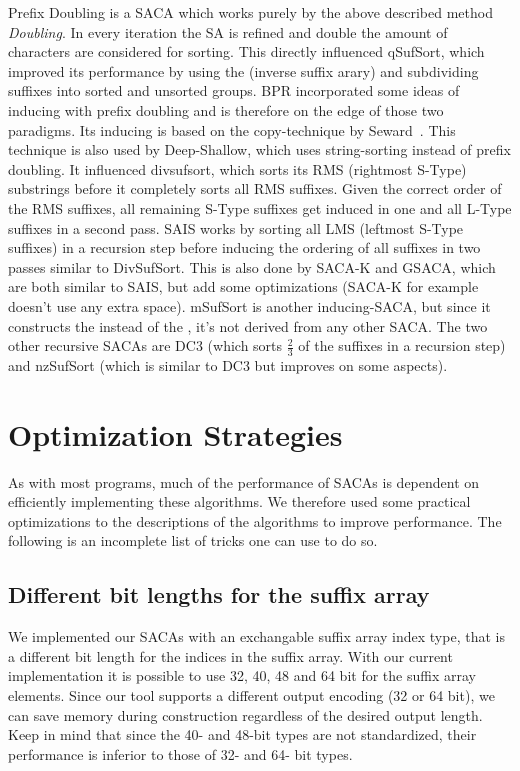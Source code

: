 Prefix Doubling is a SACA which works purely by the above described method \emph{Doubling}.
In every iteration the SA is refined and double the amount of characters are considered for sorting.
This directly influenced qSufSort, which improved its performance by using the \isa (inverse suffix arary) 
and subdividing suffixes into sorted and unsorted groups. 
BPR incorporated some ideas of inducing with prefix doubling and is therefore on the edge of those two paradigms.
Its inducing is based on the copy-technique by Seward~\cite{seward2000}.
This technique is also used by Deep-Shallow, which uses string-sorting instead of prefix doubling.
It influenced divsufsort, which sorts its RMS (rightmost S-Type) substrings before it completely sorts all RMS suffixes.
Given the correct order of the RMS suffixes, all remaining S-Type suffixes get induced in one and all L-Type suffixes in a second pass.
SAIS works by sorting all LMS (leftmost S-Type suffixes) in a recursion step before inducing the ordering of all suffixes in two passes similar to DivSufSort.
This is also done by SACA-K and GSACA, which are both similar to SAIS, but add some optimizations
(SACA-K for example doesn't use any extra space).
mSufSort is another inducing-SACA, but since it constructs the \isa instead of the \sa,
it's not derived from any other SACA.
The two other recursive SACAs are DC3 (which sorts $\frac{2}{3}$ of the suffixes in a recursion step)
and nzSufSort (which is similar to DC3 but improves on some aspects).

\section{Optimization Strategies}

As with most programs, much of the performance of SACAs is dependent on efficiently implementing these algorithms.
We therefore used some practical optimizations to the descriptions of the algorithms to improve performance.
The following is an incomplete list of tricks one can use to do so.

\subsection{Different bit lengths for the suffix array}

We implemented our SACAs with an exchangable suffix array index type, that is a different bit length for the indices in the suffix array.
With our current implementation it is possible to use 32, 40, 48 and 64 bit for the suffix array elements.
Since our tool supports a different output encoding (32 or 64 bit), we can save memory during construction regardless of the desired output length.
Keep in mind that since the 40- and 48-bit types are not standardized, their performance is inferior to those of 32- and 64- bit types.

